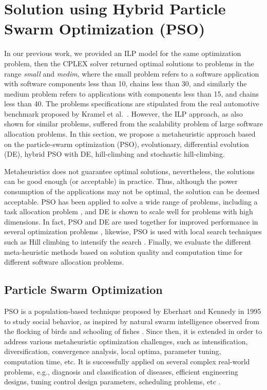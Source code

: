 \section{Solution using Hybrid Particle Swarm Optimization (PSO)}\label{sec_solution}
In our previous work, we provided an ILP model for the same optimization problem, then the CPLEX solver returned optimal solutions to problems in the range \textit{small} and \textit{medim}, where the small problem refers to a software application with software components less than 10, chains less than 30, and similarly the medium problem refers to applications with components less than 15, and chains less than 40. The problems specifications are stipulated from the real automotive benchmark proposed by Kramel et al.~\cite{Kramer2015RealFree}. However, the ILP approach, as also shown for similar problems, suffered from the scalability problem of large software allocation problems. In this section, we propose a metaheuristic approach based on the particle-swarm optimization (PSO), evolutionary, differential evolution (DE), hybrid PSO with DE,  hill-climbing and stochastic hill-climbing. 

Metaheuristics does not guarantee optimal solutions, nevertheless, the solutions can be good enough (or acceptable) in practice. Thus, although the power consumption of the applications may not be optimal, the solution can be deemed acceptable. PSO has been applied to solve a wide range of problems, including a task allocation problem \cite{yin2007task}, and DE is shown to scale well for problems with high dimensions. In fact, PSO and DE are used together for improved performance in several optimization problems \cite{bibid}, likewise, PSO is used with local search techniques such as Hill climbing to intensify the search \cite{bibid}. Finally, we evaluate the different meta-heuristic methods based on solution quality and computation time for different software allocation problems.

\subsection{Particle Swarm Optimization}
PSO is a population-based technique proposed by Eberhart and Kennedy in 1995 to study social behavior, as inspired by natural swarm intelligence observed from the flocking of birds and schooling of fishes \cite{Kennedy1995ParticleOptimization}. Since then, it is extended in order to address various metaheuristic optimization challenges, such as intensification, diversification, convergence analysis, local optima, parameter tuning, computation time, etc. It is successfully applied on several complex real-world problems, e.g., diagnosis and classification of diseases, efficient engineering designs, tuning control design parameters, scheduling problems, etc \cite{Poli2008AnApplications}. 

